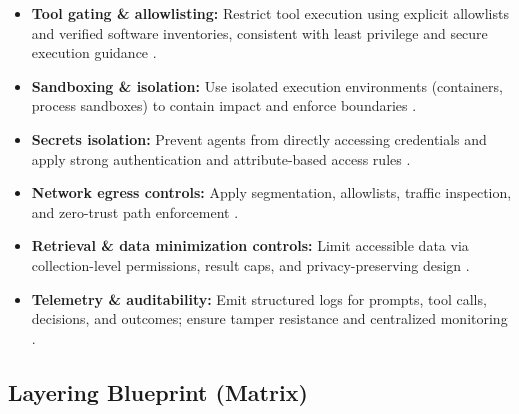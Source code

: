 \begin{TNtwocol}
      \begin{itemize}
            \item \textbf{Tool gating \& allowlisting:} Restrict tool execution using explicit allowlists and verified software inventories, consistent with least privilege and secure execution guidance \cite{CIS_Controls_v8_1,CIS_Cloud_Companion_v8_1}.
            \item \textbf{Sandboxing \& isolation:} Use isolated execution environments (containers, process sandboxes) to contain impact and enforce boundaries \cite{NIST_SP800_162,NSA_Network_Guide_2023}.
            \item \textbf{Secrets isolation:} Prevent agents from directly accessing credentials and apply strong authentication and attribute-based access rules \cite{NIST_SP800_162,NIST_SP800_52R2}.
            \item \textbf{Network egress controls:} Apply segmentation, allowlists, traffic inspection, and zero-trust path enforcement \cite{NIST_SP800_207,CISA_ZTMM_v2,NIST_SP800_41R1}.
            \item \textbf{Retrieval \& data minimization controls:} Limit accessible data via collection-level permissions, result caps, and privacy-preserving design \cite{ISO_27002_2022,NSA_Data_Pillar_2024}.
            \item \textbf{Telemetry \& auditability:} Emit structured logs for prompts, tool calls, decisions, and outcomes; ensure tamper resistance and centralized monitoring \cite{NIST_SP800_137,NIST_SP1800_35}.
      \end{itemize}

      \subsection{Layering Blueprint (Matrix)}


\end{TNtwocol}
